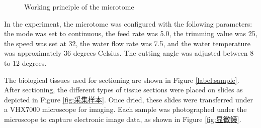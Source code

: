 \begin{figure}[htbp]
\begin{minipage}{0.35\textwidth}
        \caption{Working principle of the microtome}
        \label{fig:cutting_machine}
    \end{minipage}
\end{figure}




In the experiment, the microtome was configured with the following parameters: the mode was set to continuous, the feed rate was 5.0, the trimming value was 25, the speed was set at 32, the water flow rate was 7.5, and the water temperature was approximately 36 degrees Celsius. The cutting angle was adjusted between 8 to 12 degrees.

The biological tissues used for sectioning are shown in Figure \ref{label:sample}. After sectioning, the different types of tissue sections were placed on slides as depicted in Figure \ref{fig:采集样本}. Once dried, these slides were transferred under a VHX7000 microscope for imaging. Each sample was photographed under the microscope to capture electronic image data, as shown in Figure \ref{fig:显微镜}.

